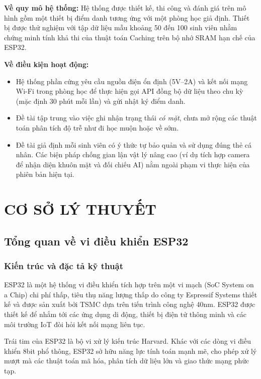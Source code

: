 \documentclass[12pt,a4paper]{report}
\begin{document}
\textbf{Về quy mô hệ thống:}  
Hệ thống được thiết kế, thi công và đánh giá trên mô hình gồm một thiết bị điểm danh tương ứng với một phòng học giả định. Thiết bị được thử nghiệm với tập dữ liệu mẫu khoảng 50 đến 100 sinh viên nhằm chứng minh tính khả thi của thuật toán Caching trên bộ nhớ SRAM hạn chế của ESP32.

\textbf{Về điều kiện hoạt động:}

\begin{itemize}
\item Hệ thống phần cứng yêu cầu nguồn điện ổn định (5V--2A) và kết nối mạng Wi-Fi trong phòng học để thực hiện gọi API đồng bộ dữ liệu theo chu kỳ (mặc định 30 phút mỗi lần) và gửi nhật ký điểm danh.
\item Đề tài tập trung vào việc ghi nhận trạng thái \textit{có mặt}, chưa mở rộng các thuật toán phân tích độ trễ như đi học muộn hoặc về sớm.
\item Đề tài giả định mỗi sinh viên có ý thức tự bảo quản và sử dụng đúng thẻ cá nhân. Các biện pháp chống gian lận vật lý nâng cao (ví dụ tích hợp camera để nhận diện khuôn mặt và đối chiếu AI) nằm ngoài phạm vi thực hiện của phiên bản hiện tại.
\end{itemize}

\chapter{CƠ SỞ LÝ THUYẾT}

\section{Tổng quan về vi điều khiển ESP32}

\subsection{Kiến trúc và đặc tả kỹ thuật}

ESP32 là một hệ thống vi điều khiển tích hợp trên một vi mạch (SoC \- System on a Chip) chi phí thấp, tiêu thụ năng lượng thấp do công ty Espressif Systems thiết kế và được sản xuất bởi TSMC dựa trên tiến trình công nghệ 40nm. ESP32 được thiết kế để nhắm tới các ứng dụng di động, thiết bị điện tử thông minh và các môi trường IoT đòi hỏi kết nối mạng liên tục.

Trái tim của ESP32 là bộ vi xử lý kiến trúc Harvard. Khác với các dòng vi điều khiển 8\-bit phổ thông, ESP32 sở hữu năng lực tính toán mạnh mẽ, cho phép xử lý mượt mà các thuật toán mã hóa, phân tích dữ liệu lớn và giao thức mạng phức tạp.
\end{document}
